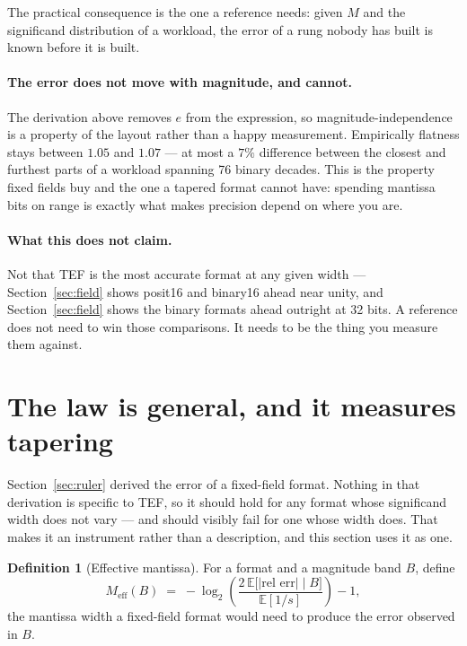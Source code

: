 \documentclass[11pt]{article}
\theoremstyle{definition}
\newtheorem{definition}{Definition}
\begin{document}
The practical consequence is the one a reference needs: given $M$ and the
significand distribution of a workload, the error of a rung nobody has built is
known before it is built.

\paragraph{The error does not move with magnitude, and cannot.} The derivation
above removes $e$ from the expression, so magnitude-independence is a property of
the layout rather than a happy measurement. Empirically flatness stays between
$1.05$ and $1.07$ --- at most a $7\%$ difference between the closest and furthest
parts of a workload spanning 76 binary decades. This is the property fixed fields
buy and the one a tapered format cannot have: spending mantissa bits on range is
exactly what makes precision depend on where you are.

\paragraph{What this does not claim.} Not that TEF is the most accurate format
at any given width --- Section~\ref{sec:field} shows posit16 and binary16 ahead
near unity, and Section~\ref{sec:field} shows the binary formats ahead outright at
32 bits. A reference does not need to win those comparisons. It needs to be the
thing you measure them against.


\section{The law is general, and it measures tapering}\label{sec:law}

Section~\ref{sec:ruler} derived the error of a fixed-field format. Nothing in that
derivation is specific to TEF, so it should hold for any format whose significand
width does not vary --- and should visibly fail for one whose width does. That
makes it an instrument rather than a description, and this section uses it as one.

\begin{definition}[Effective mantissa]
For a format and a magnitude band $B$, define
\[
  M_{\mathrm{eff}}(B) \;=\; -\log_2\!\left(\frac{2\,\mathbb{E}\bigl[|\text{rel err}|\;\big|\;B\bigr]}{\mathbb{E}[1/s]}\right) - 1 ,
\]
the mantissa width a fixed-field format would need to produce the error observed
in $B$.
\end{definition}
\end{document}
